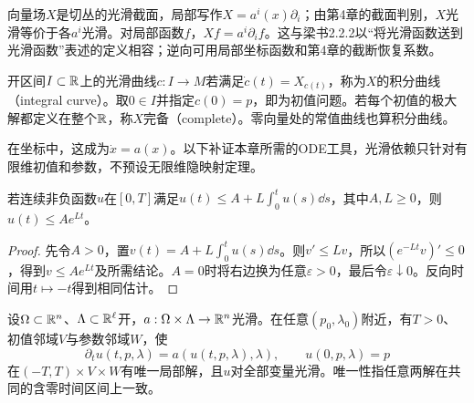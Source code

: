 向量场$X$是切丛的光滑截面，局部写作$X=a^i(x)\partial_i$；由第4章的截面判别，$X$光滑等价于各$a^i$光滑。对局部函数$f$，$Xf=a^i\partial_i f$。这与梁书2.2.2以“将光滑函数送到光滑函数”表述的定义相容；逆向可用局部坐标函数和第4章的截断恢复系数。
\begin{definition}[积分曲线与完备性]
开区间$I\subset\mathbb{R}$上的光滑曲线$c:I\to M$若满足$\dot c(t)=X_{c(t)}$，称为$X$的积分曲线（integral curve）。取$0\in I$并指定$c(0)=p$，即为初值问题。若每个初值的极大解都定义在整个$\mathbb{R}$，称$X$完备（complete）。零向量处的常值曲线也算积分曲线。
\end{definition}
在坐标中，这成为$\dot x=a(x)$。以下补证本章所需的ODE工具，光滑依赖只针对有限维初值和参数，不预设无限维隐映射定理。
\begin{lemma}[积分不等式]\label{lem:gronwall}
若连续非负函数$u$在$[0,T]$满足$u(t)\leq A+L\int_0^t u(s)\dd s$，其中$A,L\geq0$，则$u(t)\leq Ae^{Lt}$。
\end{lemma}
\begin{proof}
先令$A>0$，置$v(t)=A+L\int_0^t u(s)\dd s$。则$v'\leq Lv$，所以$(e^{-Lt}v)'\leq0$，得到$v\leq Ae^{Lt}$及所需结论。$A=0$时将右边换为任意$\varepsilon>0$，最后令$\varepsilon\downarrow0$。反向时间用$t\mapsto-t$得到相同估计。
\end{proof}
\begin{theorem}[局部解与参数光滑依赖]\label{thm:ode-local}
设$\Omega\subset\mathbb{R}^n$、$\Lambda\subset\mathbb{R}^\ell$开，$a:\Omega\times\Lambda\to\mathbb{R}^n$光滑。在任意$(p_0,\lambda_0)$附近，有$T>0$、初值邻域$V$与参数邻域$W$，使
\[
 \partial_t u(t,p,\lambda)=a(u(t,p,\lambda),\lambda),\qquad
 u(0,p,\lambda)=p
\]
在$(-T,T)\times V\times W$有唯一局部解，且$u$对全部变量光滑。唯一性指任意两解在共同的含零时间区间上一致。
\end{theorem}
